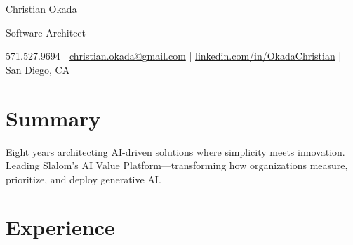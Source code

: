 \documentclass[11pt,letterpaper]{article}
\begin{document}
\begin{center}
{\headingfont\fontsize{26}{30}\selectfont\textcolor{primary}{Christian Okada}}

\vspace{6pt}

{\large\textcolor{accent}{Software Architect}}

\vspace{8pt}

{\small\textcolor{mediumtext}{
571.527.9694 \hspace{8pt} | \hspace{8pt}
\href{mailto:christian.okada@gmail.com}{christian.okada@gmail.com} \hspace{8pt} | \hspace{8pt}
\href{https://linkedin.com/in/OkadaChristian}{linkedin.com/in/OkadaChristian} \hspace{8pt} | \hspace{8pt}
San Diego, CA
}}
\end{center}

\vspace{4pt}

\section{Summary}
{\textcolor{darktext}{Eight years architecting AI-driven solutions where simplicity meets innovation. Leading Slalom's AI Value Platform—transforming how organizations measure, prioritize, and deploy generative AI.}}

\section{Experience}
\end{document}
